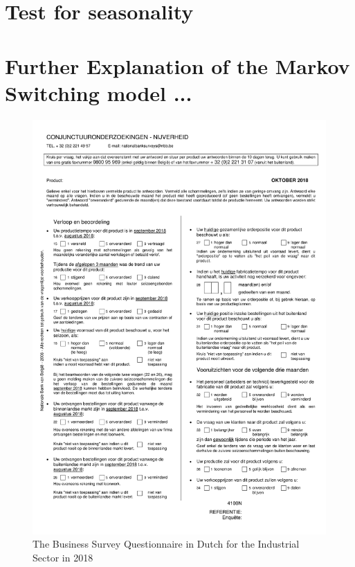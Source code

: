 \documentclass[12pt,a4paper,oneside]{book}
\begin{document}
\newpage

\section*{Test for seasonality}
\label{sec:test for seasonality}

\newpage
\section*{Further Explanation of the Markov Switching model ...}


\newpage
\begin{figure}[H]
    \centering
    \includegraphics[scale=0.75]{Images/IndustryN.pdf}
    \caption{The Business Survey Questionnaire in Dutch for the Industrial Sector in 2018}
    \label{Questionnaire2018}
\end{figure}
\end{document}
